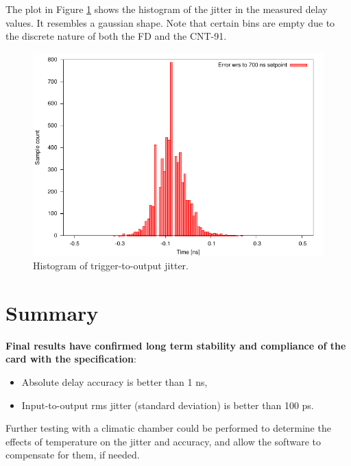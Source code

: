 \documentclass{article}
\begin{document}
The plot in Figure \ref{fig:jitter_histogram} shows the histogram of the jitter in the measured delay values. It resembles a gaussian shape. Note that certain bins are empty due to the discrete nature of both the FD and the CNT-91.

\begin{figure}[htb]
\centering
\includegraphics[width=13cm]{drawings/jitter_histogram}
\caption{Histogram of trigger-to-output jitter.}
\label{fig:jitter_histogram}
\end{figure}

\section{Summary}

\textbf{Final results have confirmed long term stability and compliance of the card with the specification}:

\begin{itemize}
\item Absolute delay accuracy is better than 1 ns,
\item Input-to-output rms jitter (standard deviation) is better than 100 ps. 
\end{itemize}

Further testing with a climatic chamber could be performed to determine the effects of temperature on the jitter and accuracy, and allow the software to compensate for them, if needed.
\end{document}
